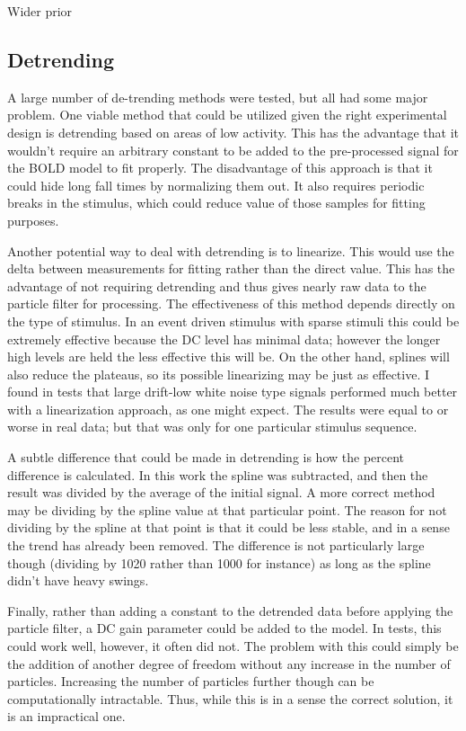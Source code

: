 Wider prior

\subsection{Detrending}
A large number of de-trending methods were tested, but all had some major problem. 
One viable method that could be utilized given the right experimental design is detrending
based on areas of low activity. This has the advantage that it wouldn't require an arbitrary
constant to be added to the pre-processed signal for the BOLD model to fit properly.
The disadvantage of this approach is that it could hide long fall times by normalizing them
out. It also requires periodic breaks in the stimulus, which could reduce value of those
samples for fitting purposes. 

Another potential way to deal with detrending is to 
linearize. This would use the delta between measurements for fitting rather than the 
direct value. This has the advantage of not requiring detrending and thus 
gives nearly raw data to the particle filter
for processing. The effectiveness of this method depends directly on the type of stimulus.
In an event driven stimulus with sparse stimuli this could be extremely effective because
the DC level has minimal data; however the longer high levels are held the less effective
this will be. On the other hand, splines will also reduce the plateaus, so its possible
linearizing may be just as effective. I found in tests that large drift-low white noise
type signals performed much better with a linearization approach, as one might expect. 
The results were equal to or worse in real data; but that was only for one particular
stimulus sequence. 

A subtle difference that could be made in detrending is how the percent difference
is calculated. In this work the spline was subtracted, and then the result
was divided by the average of the initial signal. A more correct method may be dividing
by the spline value at that particular point. The reason for not dividing by the spline
at that point is that it could be less stable, and in a sense the trend has already
been removed. The difference is not particularly large though 
(dividing by 1020 rather than 1000 for instance) as long as the spline didn't have heavy swings. 

Finally, rather than adding a constant to the detrended data before
applying the particle filter, a DC gain parameter could be added to the model. In
tests, this could work well, however, it often did not. The problem with this
could simply be the addition of another degree of freedom without any increase in
the number of particles. Increasing the number of particles further though
can be computationally intractable. Thus, while this is in a sense the correct
solution, it is an impractical one. 


